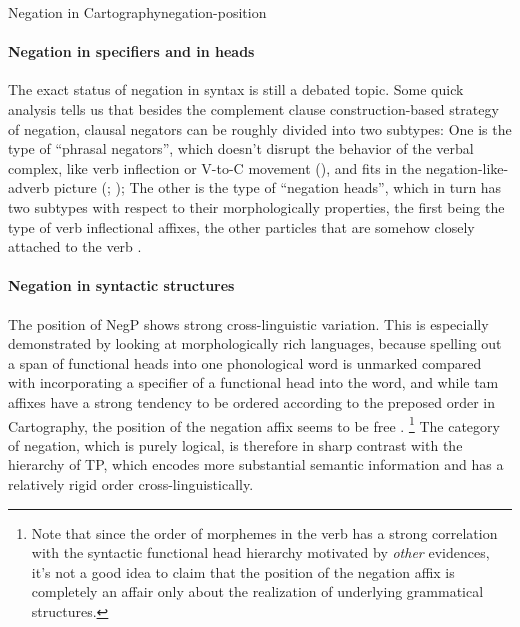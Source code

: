 \documentclass[UTF8, a4paper, oneside, scheme=plain]{ctexrep}
\newcommand*{\citesec}[1]{\S~{#1}}
\newcommand*{\citepage}[1]{pp.~{#1}}
\begin{document}
\begin{theorybox}{Negation in Cartography}{negation-position}
    \paragraph*{Negation in specifiers and in heads}
    The exact status of negation in syntax is still a debated topic.
    Some quick analysis tells us that besides 
    the complement clause construction-based strategy of negation,
    clausal negators can be roughly divided into two subtypes:
    One is the type of ``phrasal negators'',
    which doesn't disrupt the behavior of the verbal complex,
    like verb inflection or V-to-C movement (),
    and fits in the negation-like-adverb picture 
    (\citealt[\citepage{101}]{zanuttini1997negation};
    \citealt[\citesec{4.7}]{radford2009analysing});
    The other is the type of ``negation heads'',
    which in turn has two subtypes with respect to their morphologically properties,
    the first being the type of verb inflectional affixes,
    the other particles that are somehow closely attached to the verb \citep{zeijlstra2013}.    

    \paragraph*{Negation in syntactic structures} 
    The position of NegP shows strong cross-linguistic variation.
    This is especially demonstrated by looking at morphologically rich languages,
    because spelling out a span of functional heads into one phonological word
    is unmarked compared with incorporating a specifier of a functional head 
    into the word,
    and while \acs{tam} affixes have a strong tendency to be ordered 
    according to the preposed order in Cartography, 
    the position of the negation affix seems to be free \citep[\citepage{15}]{moscati2010negation}.%
    \footnote{
        Note that since the order of morphemes in the verb has a strong correlation 
        with the syntactic functional head hierarchy motivated by \emph{other} evidences,
        it's not a good idea to claim that the position of the negation affix 
        is completely an affair only about the realization of underlying grammatical structures.
    }
    The category of negation, which is purely logical, is therefore in sharp contrast with 
    the hierarchy of TP, 
    which encodes more substantial semantic information
    and has a relatively rigid order cross-linguistically.


\end{theorybox}
\end{document}
